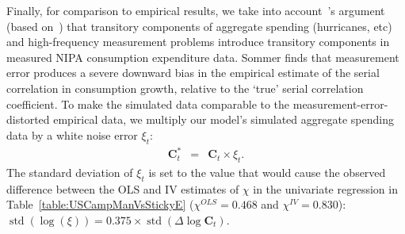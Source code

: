 \documentclass[titlepage]{article}
\def\std{\operatorname{std}} %
\begin{document}
Finally, for comparison to empirical results, we take into account~\cite{som07}'s argument (based on~\cite{wilcox:aer}) that transitory components of aggregate spending (hurricanes, etc) and high-frequency measurement problems introduce transitory components in measured NIPA consumption expenditure data.  Sommer finds that measurement error produces a severe downward bias in the empirical estimate of the serial correlation in consumption growth, relative to the `true' serial correlation coefficient.  To make the simulated data comparable to the measurement-error-distorted empirical data, we multiply our model's simulated aggregate spending data by a white noise error $\xi_t$:
\begin{eqnarray*}
	{\mathbf{C}}^*_{t} & = & \mathbf{C}_{t}\times\xi_{t}.
\end{eqnarray*}
The standard deviation of $\xi_t$ is set to the value that would cause the observed difference between the OLS and IV estimates of $\chi$ in the univariate regression in Table~\ref{table:USCampManVsStickyE} ($\chi^{OLS}=0.468$ and $\chi^{IV}=0.830$): $\std(\log(\xi))= 0.375\times\std(\Delta \log \mathbf{C}_t)$.
\end{document}
